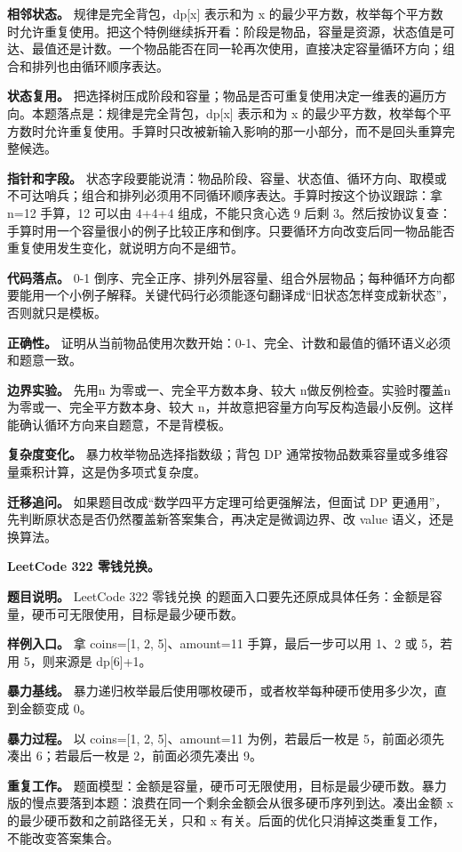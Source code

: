\textbf{相邻状态。} 规律是完全背包，dp[x] 表示和为 x 的最少平方数，枚举每个平方数时允许重复使用。把这个特例继续拆开看：阶段是物品，容量是资源，状态值是可达、最值还是计数。一个物品能否在同一轮再次使用，直接决定容量循环方向；组合和排列也由循环顺序表达。

\textbf{状态复用。} 把选择树压成阶段和容量；物品是否可重复使用决定一维表的遍历方向。本题落点是：规律是完全背包，dp[x] 表示和为 x 的最少平方数，枚举每个平方数时允许重复使用。手算时只改被新输入影响的那一小部分，而不是回头重算完整候选。

\textbf{指针和字段。} 状态字段要能说清：物品阶段、容量、状态值、循环方向、取模或不可达哨兵；组合和排列必须用不同循环顺序表达。手算时按这个协议跟踪：拿 n=12 手算，12 可以由 4+4+4 组成，不能只贪心选 9 后剩 3。然后按协议复查：手算时用一个容量很小的例子比较正序和倒序。只要循环方向改变后同一物品能否重复使用发生变化，就说明方向不是细节。

\textbf{代码落点。} 0-1 倒序、完全正序、排列外层容量、组合外层物品；每种循环方向都要能用一个小例子解释。关键代码行必须能逐句翻译成“旧状态怎样变成新状态”，否则就只是模板。

\textbf{正确性。} 证明从当前物品使用次数开始：0-1、完全、计数和最值的循环语义必须和题意一致。

\textbf{边界实验。} 先用n 为零或一、完全平方数本身、较大 n做反例检查。实验时覆盖n 为零或一、完全平方数本身、较大 n，并故意把容量方向写反构造最小反例。这样能确认循环方向来自题意，不是背模板。

\textbf{复杂度变化。} 暴力枚举物品选择指数级；背包 DP 通常按物品数乘容量或多维容量乘积计算，这是伪多项式复杂度。

\textbf{迁移追问。} 如果题目改成“数学四平方定理可给更强解法，但面试 DP 更通用”，先判断原状态是否仍然覆盖新答案集合，再决定是微调边界、改 value 语义，还是换算法。

\noindent\textbf{LeetCode 322 零钱兑换。}

\textbf{题目说明。} LeetCode 322 零钱兑换 的题面入口要先还原成具体任务：金额是容量，硬币可无限使用，目标是最少硬币数。

\textbf{样例入口。} 拿 coins=[1, 2, 5]、amount=11 手算，最后一步可以用 1、2 或 5，若用 5，则来源是 dp[6]+1。

\textbf{暴力基线。} 暴力递归枚举最后使用哪枚硬币，或者枚举每种硬币使用多少次，直到金额变成 0。

\textbf{暴力过程。} 以 coins=[1, 2, 5]、amount=11 为例，若最后一枚是 5，前面必须先凑出 6；若最后一枚是 2，前面必须先凑出 9。

\textbf{重复工作。} 题面模型：金额是容量，硬币可无限使用，目标是最少硬币数。暴力版的慢点要落到本题：浪费在同一个剩余金额会从很多硬币序列到达。凑出金额 x 的最少硬币数和之前路径无关，只和 x 有关。后面的优化只消掉这类重复工作，不能改变答案集合。

